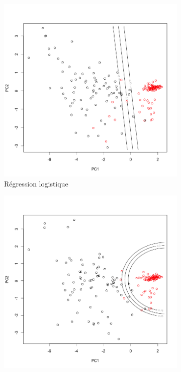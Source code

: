 \documentclass[a4paper,10pt]{report}
\begin{document}
\begin{figure}[H]
	\centering
	\captionsetup{justification=centering, margin=2cm}
	\begin{subfigure}[b]{0.33\linewidth}
		\centering
		\captionsetup{justification=centering, margin=0cm}
		\includegraphics[width=1\linewidth]{img/2-3-3-front-ACP-breastcancer-log}
		\caption{\small Régression logistique}
	\end{subfigure}%
	\begin{subfigure}[b]{0.33\linewidth}
		\centering
		\captionsetup{justification=centering, margin=0cm}
		\includegraphics[width=1\linewidth]{img/2-3-3-front-ACP-breastcancer-nba}

\end{subfigure}
\end{figure}
\end{document}
